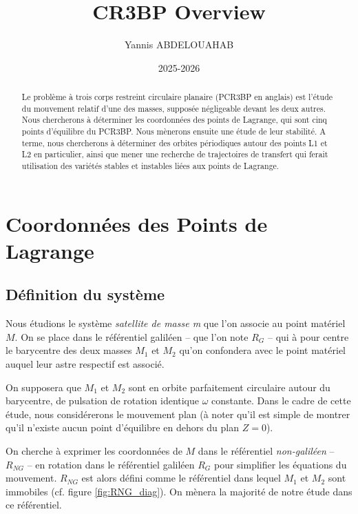 \documentclass[12pt]{article}
\title{CR3BP Overview}
\author{Yannis ABDELOUAHAB}
\date{2025-2026}
\begin{document}
	\maketitle
	\tableofcontents
	
	\begin{abstract}
		Le problème à trois corps restreint circulaire planaire (PCR3BP en anglais) est l'étude du mouvement relatif d'une des masses, supposée négligeable devant les deux autres. Nous chercherons à déterminer les coordonnées des points de Lagrange, qui sont cinq points d'équilibre du PCR3BP. Nous mènerons ensuite une étude de leur stabilité. A terme, nous chercherons à déterminer des orbites périodiques autour des points L1 et L2 en particulier, ainsi que mener une recherche de trajectoires de transfert qui ferait utilisation des variétés stables et instables liées aux points de Lagrange.
	\end{abstract}
	
	\section{Coordonnées des Points de Lagrange}
	\subsection{Définition du système}
	\label{def_system}
	Nous étudions le système \emph{satellite de masse m} que l'on associe au point matériel $M$. On se place dans le référentiel galiléen -- que l'on note $R_G$ -- qui à pour centre le barycentre des deux masses $M_1$ et $M_2$ qu'on confondera avec le point matériel auquel leur astre respectif est associé.
	
	On supposera que $M_1$ et $M_2$ sont en orbite parfaitement circulaire autour du barycentre, de pulsation de rotation identique $\omega$ constante. Dans le cadre de cette étude, nous considérerons le mouvement plan (à noter qu'il est simple de montrer qu'il n'existe aucun point d'équilibre en dehors du plan $Z=0$).
	
	On cherche à exprimer les coordonnées de $M$ dans le référentiel \textit{non-galiléen} -- $R_{NG}$ -- en rotation dans le référentiel galiléen $R_G$ pour simplifier les équations du mouvement. $R_{NG}$ est alors défini comme le référentiel dans lequel $M_1$ et $M_2$ sont immobiles (cf. figure \ref{fig:RNG_diag}). On mènera la majorité de notre étude dans ce référentiel.
	
\end{document}
